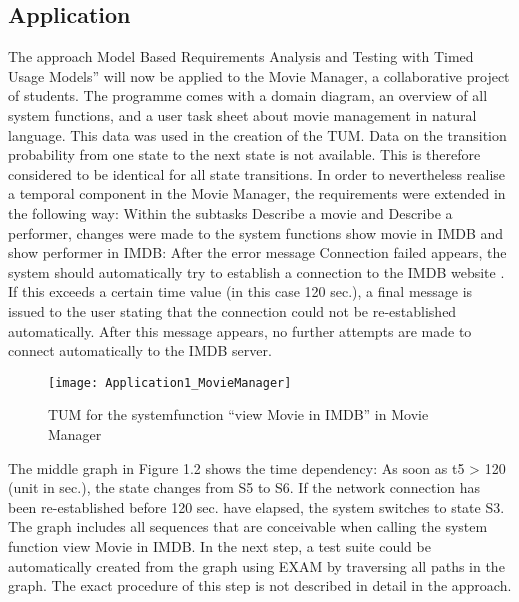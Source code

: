 \subsection{Application}

The approach \textquotedbl Model Based Requirements Analysis and Testing
with Timed Usage Models'' will now be applied to the Movie Manager,
a collaborative project of students. The programme comes with a domain
diagram, an overview of all system functions, and a user task sheet
about movie management in natural language. This data was used in
the creation of the TUM. Data on the transition probability from one
state to the next state is not available. This is therefore considered
to be identical for all state transitions. In order to nevertheless
realise a temporal component in the Movie Manager, the requirements
were extended in the following way: Within the subtasks \textquotedbl Describe
a movie\textquotedbl{} and \textquotedbl Describe a performer\textquotedbl ,
changes were made to the system functions \textquotedbl show movie
in IMDB\textquotedbl{} and \textquotedbl show performer in IMDB\textquotedbl :
After the error message \textquotedbl Connection failed\textquotedbl{}
appears, the system should automatically try to establish a connection
to the IMDB website \cite*{imdb}. If this exceeds a certain time
value (in this case 120 sec.), a final message is issued to the user
stating that the connection could not be re-established automatically.
After this message appears, no further attempts are made to connect
automatically to the IMDB server.

\begin{figure}[H]
\begin{centering}
\texttt{[image: Application1\_MovieManager]} 
\par\end{centering}
\caption{TUM for the systemfunction ``view Movie in IMDB'' in Movie Manager}
\end{figure}
The middle graph in Figure 1.2 shows the time dependency: As soon
as t5 \textgreater{} 120 (unit in sec.), the state changes from
S5 to S6. If the network connection has been re-established before
120 sec. have elapsed, the system switches to state S3. The graph
includes all sequences that are conceivable when calling the system
function \textquotedbl view Movie in IMDB\textquotedbl . In the next
step, a test suite could be automatically created from the graph using
EXAM by traversing all paths in the graph. The exact procedure of
this step is not described in detail in the approach.

